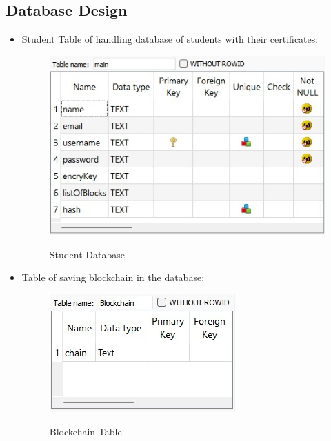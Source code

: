 \subsection{Database Design}
\begin{itemize}
    \item Student Table of handling database of students with their certificates:
    \begin{figure}[h]
        \centering
        \includegraphics[scale=0.70]{images/Database Description.jpeg}\\[0.5cm]
        \caption{Student Database}
        \label{fig:Student Database}
    \end{figure}
    
    \item Table of saving blockchain in the database:
    \begin{figure}[h]
        \centering
        \includegraphics[scale=0.70]{images/2nd database description.jpeg}\\[0.5cm]
        \caption{Blockchain Table}
        \label{fig:Blockchain Table}
    \end{figure}

\end{itemize}




